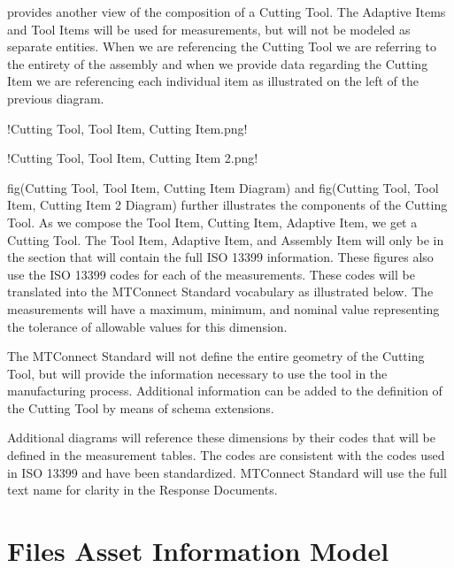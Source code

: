 \FloatBarrier


 provides another view of the composition of a Cutting Tool. The Adaptive Items and Tool Items will be used for measurements, but will not be modeled as separate entities. When we are referencing the Cutting Tool we are referring to the entirety of the assembly and when we provide data regarding the Cutting Item we are referencing each individual item as illustrated on the left of the previous diagram.

!Cutting Tool, Tool Item, Cutting Item.png!

!Cutting Tool, Tool Item, Cutting Item 2.png!

{{fig(Cutting Tool, Tool Item, Cutting Item Diagram)}} and {{fig(Cutting Tool, Tool Item, Cutting Item 2 Diagram)}} further illustrates the components of the Cutting Tool. As we compose the Tool Item, Cutting Item, Adaptive Item, we get a Cutting Tool. The Tool Item, Adaptive Item, and Assembly Item will only be in the  section that will contain the full ISO 13399 information. These figures also use the ISO 13399 codes for each of the measurements. These codes will be translated into the MTConnect Standard vocabulary as illustrated below. The measurements will have a maximum, minimum, and nominal value representing the tolerance of allowable values for this dimension.

The MTConnect Standard will not define the entire geometry of the Cutting Tool, but will provide the information necessary to use the tool in the manufacturing process. Additional information can be added to the definition of the Cutting Tool by means of schema extensions.

Additional diagrams will reference these dimensions by their codes that will be defined in the measurement tables. The codes are consistent with the codes used in ISO 13399 and have been standardized. MTConnect Standard will use the full text name for clarity in the \glspl{Response Document}.













\section{Files Asset Information Model}
\label{sec:Files Asset Information Model}

